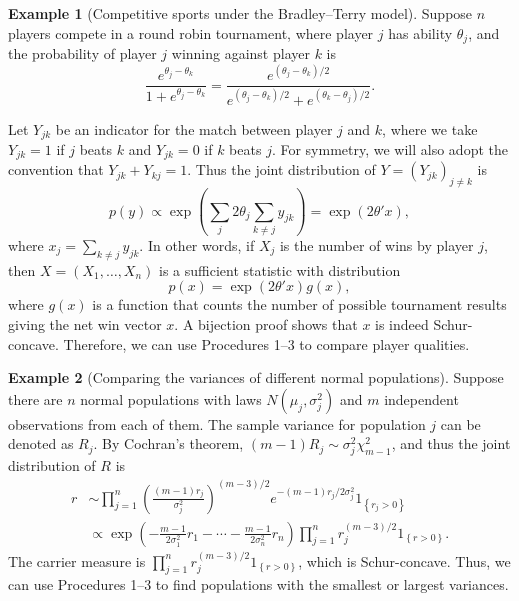 \documentclass[11pt]{article}
\theoremstyle{definition}
\newtheorem{example}{Example}
\theoremstyle{custom}
\begin{document}
\begin{example}[Competitive sports under the Bradley--Terry model]
  Suppose $n$ players compete in a round robin tournament, where player $j$ has ability $\theta_j$, and the probability of player $j$ winning against player $k$ is
$$\frac{e^{\theta_j - \theta_k}}{1 + e^{\theta_j - \theta_k}} = \frac{e^{\left(\theta_j - \theta_k\right) / 2}}{e^{\left(\theta_j - \theta_k\right) / 2} + e^{\left(\theta_k - \theta_j\right) / 2}}.$$

Let $Y_{jk}$ be an indicator for the match between player $j$ and $k$, where we take $Y_{jk} = 1$ if $j$ beats $k$ and $Y_{jk} = 0$ if $k$ beats $j$. For symmetry, we will also adopt the convention that $Y_{jk} + Y_{kj} = 1$. Thus the joint distribution of $Y=\left(Y_{jk}\right)_{j\neq k}$ is
$$p\left(y\right) \propto \exp\left(\sum_j 2\theta_j \sum_{k \ne j} y_{jk}\right)  = \exp\left(2\theta' x\right),$$
where $x_j = \sum_{k \ne j} y_{jk}$. In other words, if $X_j$ is the number of wins by player $j$, then $X=(X_1,\ldots,X_n)$ is a sufficient statistic with distribution
$$p\left(x\right) = \exp\left(2\theta' x\right) g\left(x\right),$$
where $g\left(x\right)$ is a function that counts the number of possible tournament results giving the net win vector $x$. A bijection proof shows that $x$ is indeed Schur-concave. Therefore, we can use Procedures 1--3 to compare player qualities.
\end{example}

\begin{example}[Comparing the variances of different normal populations] Suppose there are $n$ normal populations with laws $N\left(\mu_j, \sigma_j^2\right)$ and $m$ independent observations from each of them. The sample variance for population $j$ can be denoted as $R_j$. By Cochran's theorem, $\left(m-1\right) R_j \sim \sigma_j^2 \chi_{m-1}^2$, and thus the joint distribution of $R$ is
\begin{align*}
r & \sim \prod_{j=1}^n \left(\frac{\left(m-1\right) r_j}{\sigma_j^2}\right)^{\left(m-3\right) / 2} e^{-\left(m-1\right) r_j / 2 \sigma_j^2} 1_{\left\{r_j > 0 \right\}} \\
& \propto \exp\left(-\frac{m-1}{2 \sigma_1^2} r_1 - \cdots - \frac{m-1}{2 \sigma_n^2} r_n\right) \prod_{j=1}^n r_j^{\left(m-3\right) / 2} 1_{\left\{r > 0\right\}}.
\end{align*}
The carrier measure is $\prod_{j=1}^n r_j^{\left(m-3\right) / 2} 1_{\left\{r > 0\right\}}$, which is Schur-concave. Thus, we can use Procedures 1--3 to find populations with the smallest or largest variances.
\end{example}
\end{document}
